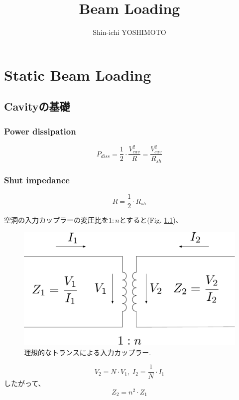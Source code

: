 \documentclass[book]{jlreq}
\begin{document}
\title{Beam Loading}
\author{Shin-ichi YOSHIMOTO}
\maketitle
\tableofcontents


\chapter{Static Beam Loading}
\section{Cavityの基礎}
\subsection{Power dissipation}
\begin{equation}
    P_{diss} = \frac{1}{2} \cdot \frac{V_{cav}^2}{R} = \frac{V_{cav}^2}{R_{sh}}
\end{equation}

\subsection{Shut impedance}
\begin{equation}
    R = \frac{1}{2}\cdot R_{sh}
\end{equation}

空洞の入力カップラーの変圧比を$1:n$とすると(Fig. \ref{fig:Ideal_Trans})、
%
\begin{figure}[hbt]
    \begin{center}
        \includegraphics[width=\linewidth]{figs/Ideal_Transformer.pdf}
        \caption{理想的なトランスによる入力カップラー.}
        \label{fig:Ideal_Trans}
    \end{center}
\end{figure}
%
\begin{equation}
    V_2 = N\cdot V_1, \; I_2 = \frac{1}{N}\cdot I_1
\end{equation}
%
したがって、
\begin{equation}
    Z_2 = n^2 \cdot Z_1
\end{equation}
\end{document}
